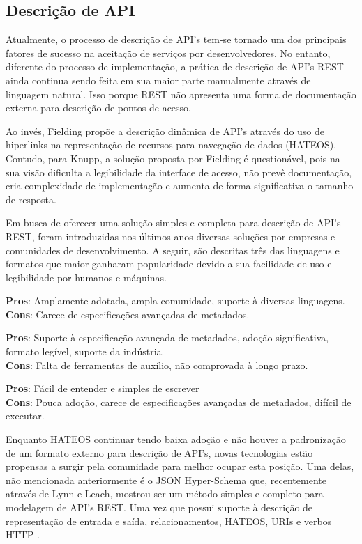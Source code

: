 \subsection[Descrição de API]{Descrição de API}

Atualmente, o processo de descrição de API's tem-se tornado um dos principais fatores de sucesso na aceitação de serviços por desenvolvedores. No entanto, diferente do processo de implementação, a prática de descrição de API's REST ainda continua sendo feita em sua maior parte manualmente através de linguagem natural. Isso porque REST não apresenta uma forma de documentação externa para descrição de pontos de acesso. \cite{LuckyEtAl2016}

Ao invés, Fielding propõe a descrição dinâmica de API's através do uso de hiperlinks na representação de recursos para navegação de dados (HATEOS). Contudo, para Knupp, a solução proposta por Fielding é questionável, pois na sua visão dificulta a legibilidade da interface de acesso, não prevê documentação, cria complexidade de implementação e aumenta de forma significativa o tamanho de resposta. \cite{Knupp2016}

Em busca de oferecer uma solução simples e completa para descrição de API's REST, foram introduzidas nos últimos anos diversas soluções por empresas e comunidades de desenvolvimento. A seguir, são descritas três das linguagens e formatos que maior ganharam popularidade devido a sua facilidade de uso e legibilidade por humanos e máquinas. \cite{Sandoval2015}

\begin{description}[leftmargin=8em,style=nextline]
  \item[\textbf{OpenAPI}] \textbf{Pros}: Amplamente adotada, ampla comunidade, suporte à diversas linguagens. \\ \textbf{Cons}: Carece de especificações avançadas de metadados.
  \item[\textbf{RAML}] \textbf{Pros}: Suporte à especificação avançada de metadados, adoção significativa, formato legível, suporte da indústria. \\ \textbf{Cons}: Falta de ferramentas de auxílio, não comprovada à longo prazo.
  \item[\textbf{API Blueprint}] \textbf{Pros}: Fácil de entender e simples de escrever \\ \textbf{Cons}: Pouca adoção, carece de especificações avançadas de metadados, difícil de executar.
\end{description}

Enquanto HATEOS continuar tendo baixa adoção e não houver a padronização de um formato externo para descrição de API's, novas tecnologias estão propensas a surgir pela comunidade para melhor ocupar esta posição. Uma delas, não mencionada anteriormente é o JSON Hyper-Schema que, recentemente através de Lynn e Leach, mostrou ser um método simples e completo para modelagem de API's REST. Uma vez que possui suporte à descrição de representação de entrada e saída, relacionamentos, HATEOS, URIs e verbos HTTP  \cite{LynnEtAl2016} \cite{Leach2014}.
